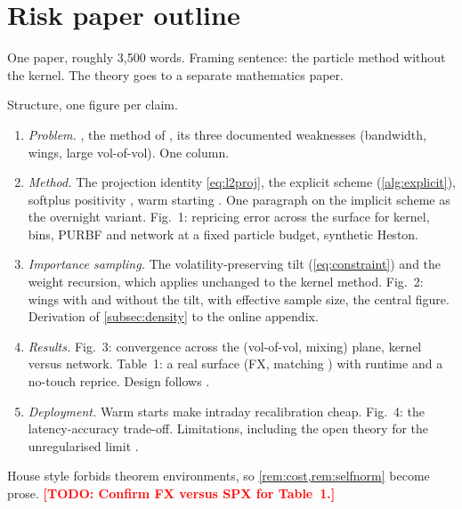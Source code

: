 \documentclass[11pt,a4paper]{article}
\theoremstyle{plain}
\theoremstyle{definition}
\theoremstyle{definition}
\newcommand{\inlinetodo}[1]{\textcolor{red}{\textbf{[TODO: #1]}}}
\begin{document}
\section{Risk paper outline}\label{sec:riskoutline}

One paper, roughly 3{,}500 words. Framing sentence: the particle method without the kernel. The theory goes to a separate mathematics paper.

Structure, one figure per claim.

\begin{enumerate}
\item \emph{Problem.} , the method of \citet{guyon2012particular}, its three documented weaknesses (bandwidth, wings, large vol-of-vol). One column.
\item \emph{Method.} The projection identity \cref{eq:l2proj}, the explicit scheme (\cref{alg:explicit}), softplus positivity \citep{vanderstoep2014}, warm starting \citep{hakala2019}. One paragraph on the implicit scheme as the overnight variant. Fig.~1: repricing error across the surface for kernel, bins, PURBF and network at a fixed particle budget, synthetic Heston.
\item \emph{Importance sampling.} The volatility-preserving tilt (\cref{eq:constraint}) and the weight recursion, which applies unchanged to the kernel method. Fig.~2: wings with and without the tilt, with effective sample size, the central figure. Derivation of \cref{subsec:density} to the online appendix.
\item \emph{Results.} Fig.~3: convergence across the (vol-of-vol, mixing) plane, kernel versus network. Table~1: a real surface (FX, matching \citet{cozma2019}) with runtime and a no-touch reprice. Design follows \citet{li2023thesis}.
\item \emph{Deployment.} Warm starts make intraday recalibration cheap. Fig.~4: the latency-accuracy trade-off. Limitations, including the open theory for the unregularised limit \citep{bayer2022rkhs}.
\end{enumerate}

House style forbids theorem environments, so \cref{rem:cost,rem:selfnorm} become prose. \inlinetodo{Confirm FX versus SPX for Table~1.}
\end{document}
